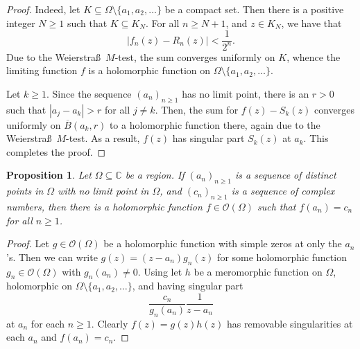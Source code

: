 \documentclass[11pt]{article}
\theoremstyle{thmstyle}
\newtheorem{proposition}[theorem]{Proposition}
\theoremstyle{defstyle}
\newcommand{\bbC}{\mathbb{C}}
\newcommand{\scrO}{\mathscr{O}} %
\renewcommand{\ge}{\geqslant}
\begin{document}
\begin{proof}
    Indeed, let $K\subseteq\Omega\setminus\{a_1,a_2,\dots\}$ be a compact set. Then there is a positive integer $N\ge 1$ such that $K\subseteq K_N$. For all $n\ge N + 1$, and $z\in K_N$, we have that 
    \begin{equation*}
        |f_n(z) - R_n(z)| < \frac{1}{2^n}.
    \end{equation*}
    Due to the Weierstra\ss\ $M$-test, the sum converges uniformly on $K$, whence the limiting function $f$ is a holomorphic function on $\Omega\setminus\{a_1,a_2,\dots\}$.

    Let $k\ge 1$. Since the sequence $(a_n)_{n\ge 1}$ has no limit point, there is an $r > 0$ such that $|a_j - a_k| > r$ for all $j\ne k$. Then, the sum for $f(z) - S_k(z)$ converges uniformly on $\overline B(a_k, r)$ to a holomorphic function there, again due to the Weierstra\ss\ $M$-test. As a result, $f(z)$ has singular part $S_k(z)$ at $a_k$. This completes the proof.
\end{proof}

\begin{proposition}
    Let $\Omega\subseteq\bbC$ be a region. If $(a_n)_{n\ge 1}$ is a sequence of distinct points in $\Omega$ with no limit point in $\Omega$, and $(c_n)_{n\ge 1}$ is a sequence of complex numbers, then there is a holomorphic function $f\in\scrO(\Omega)$ such that $f(a_n) = c_n$ for all $n\ge 1$.
\end{proposition}
\begin{proof}
    Let $g\in\scrO(\Omega)$ be a holomorphic function with simple zeros at only the $a_n$'s. Then we can write $g(z) = (z - a_n)g_n(z)$ for some holomorphic function $g_n\in\scrO(\Omega)$ with $g_n(a_n)\ne 0$. Using  let $h$ be a meromorphic function on $\Omega$, holomorphic on $\Omega\setminus\{a_1, a_2,\dots\}$, and having singular part 
    \begin{equation*}
        \frac{c_n}{g_n(a_n)}\frac{1}{z - a_n}
    \end{equation*}
    at $a_n$ for each $n\ge 1$. Clearly $f(z) = g(z)h(z)$ has removable singularities at each $a_n$ and $f(a_n) = c_n$. 
\end{proof}
\end{document}
